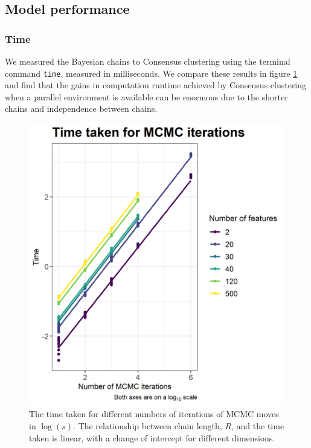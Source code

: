\documentclass[]{article}
\begin{document}

\subsection{Model performance} \label{sec:simModelPerformance}

\subsubsection{Time}
We measured the Bayesian chains to Consensus clustering using the terminal command \texttt{time}, measured in milliseconds. We compare these results in figure \ref{fig:timeMCMC} and find that the gains in computation runtime achieved by Consensus clustering when a parallel environment is available can be enormous due to the shorter chains and independence between chains.

\begin{figure} %
	\centering
	\includegraphics[scale=0.75]{./Images/Simulations/TimeComparison.png}	
	\caption{The time taken for different numbers of iterations of MCMC moves in $\log(s)$. The relationship between chain length, $R$, and the time taken is linear, with a change of intercept for different dimensions.}
	\label{fig:timeMCMC}
\end{figure}
\end{document}
